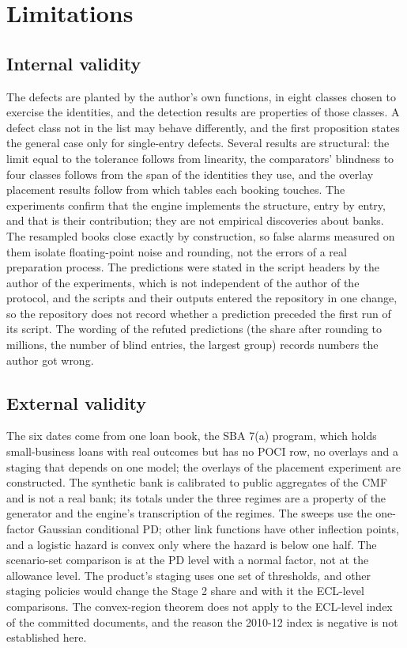 \section{Limitations}
\label{sec:limitations}

\subsection{Internal validity}
\label{sec:lim-internal}

The defects are planted by the author's own functions, in eight classes chosen to exercise the identities, and the detection results are properties of those classes.
A defect class not in the list may behave differently, and the first proposition states the general case only for single-entry defects.
Several results are structural: the limit equal to the tolerance follows from linearity, the comparators' blindness to four classes follows from the span of the identities they use, and the overlay placement results follow from which tables each booking touches.
The experiments confirm that the engine implements the structure, entry by entry, and that is their contribution; they are not empirical discoveries about banks.
The resampled books close exactly by construction, so false alarms measured on them isolate floating-point noise and rounding, not the errors of a real preparation process.
The predictions were stated in the script headers by the author of the experiments, which is not independent of the author of the protocol, and the scripts and their outputs entered the repository in one change, so the repository does not record whether a prediction preceded the first run of its script.
The wording of the refuted predictions (the share after rounding to millions, the number of blind entries, the largest group) records numbers the author got wrong.

\subsection{External validity}
\label{sec:lim-external}

The six dates come from one loan book, the SBA 7(a) program, which holds small-business loans with real outcomes but has no POCI row, no overlays and a staging that depends on one model; the overlays of the placement experiment are constructed.
The synthetic bank is calibrated to public aggregates of the CMF and is not a real bank; its totals under the three regimes are a property of the generator and the engine's transcription of the regimes.
The sweeps use the one-factor Gaussian conditional PD; other link functions have other inflection points, and a logistic hazard is convex only where the hazard is below one half.
The scenario-set comparison is at the PD level with a normal factor, not at the allowance level.
The product's staging uses one set of thresholds, and other staging policies would change the Stage 2 share and with it the ECL-level comparisons.
The convex-region theorem does not apply to the ECL-level index of the committed documents, and the reason the 2010-12 index is negative is not established here.

